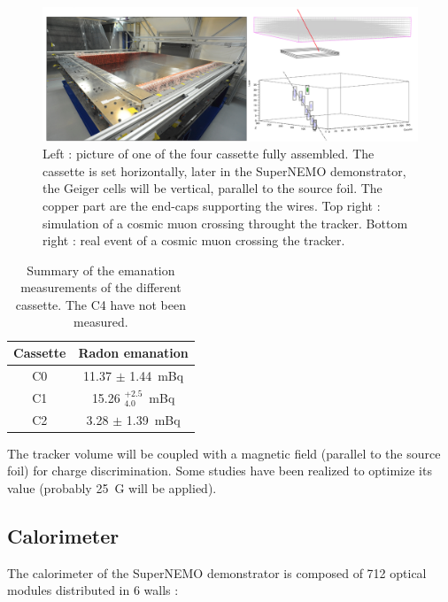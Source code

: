 \documentclass[main.tex]{subfiles}
\begin{document}
\begin{figure}[h!]
\begin{center}
\includegraphics[scale=0.25]{pictures/Chap3/TrackerTestCosmic.png}
\caption{Left : picture of one of the four cassette fully assembled. The cassette is set horizontally, later in the SuperNEMO demonstrator, the Geiger cells will be vertical, parallel to the source foil. The copper part are the end-caps supporting the wires. Top right : simulation of a cosmic muon crossing throught the tracker. Bottom right : real event of a cosmic muon crossing the tracker.}
\label{SnemoTracker}
\end{center}
\end{figure}


\begin{table}[h!]
\centering
\begin{tabular}{c|c}
Cassette & Radon emanation \\
\toprule
C0 & 11.37 $\pm$ 1.44~mBq \\
C1 & 15.26 $^{+\text{2.5}}_{\text{4.0}}$~mBq \\
C2 & 3.28 $\pm$ 1.39~mBq \\
\bottomrule
\end{tabular}
\caption{Summary of the emanation measurements of the different cassette. The C4 have not been measured.}
\label{tab:RadonEmanation}
\end{table}


\NI The tracker volume will be coupled with a magnetic field (parallel to the source foil) for charge discrimination. Some studies have been realized to optimize its value (probably 25~G will be applied). 



\FloatBarrier

\subsection{Calorimeter}


\NI The calorimeter of the SuperNEMO demonstrator is composed of 712 optical modules distributed in 6 walls : 
\end{document}
